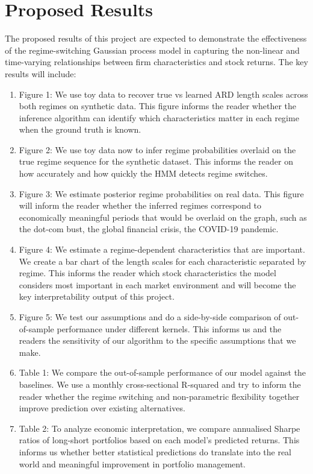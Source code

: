 \documentclass[11pt]{article}
\begin{document}
\section{Proposed Results}
The proposed results of this project are expected to demonstrate the effectiveness of the regime-switching Gaussian process model in capturing the non-linear and time-varying relationships between firm characteristics and stock returns. The key results will include:
\begin{enumerate}
    \item Figure 1: We use toy data to recover true vs learned ARD length scales across both regimes on synthetic data. This figure informs the reader whether the inference algorithm can identify which characteristics matter in each regime when the ground truth is known. 
    \item Figure 2: We use toy data now to infer regime probabilities overlaid on the true regime sequence for the synthetic dataset. This informs the reader on how accurately and how quickly the HMM detects regime switches. 
    \item Figure 3: We estimate posterior regime probabilities on real data. This figure will inform the reader whether the inferred regimes correspond to economically meaningful periods that would be overlaid on the graph, such as the dot-com bust, the global financial crisis, the COVID-19 pandemic. 
    \item Figure 4: We estimate a regime-dependent characteristics that are important. We create a bar chart of the length scales for each characteristic separated by regime. This informs the reader which stock characteristics the model considers most important in each market environment and will become the key interpretability output of this project. 
    \item Figure 5: We test our assumptions and do a side-by-side comparison of out-of-sample performance under different kernels. This informs us and the readers the sensitivity of our algorithm to the specific assumptions that we make. 
    \item Table 1: We compare the out-of-sample performance of our model against the baselines. We use a monthly cross-sectional R-squared and try to inform the reader whether the regime switching and non-parametric flexibility together improve prediction over existing alternatives. 
    \item Table 2: To analyze economic interpretation, we compare annualised Sharpe ratios of long-short portfolios based on each model's predicted returns. This informs us whether better statistical predictions do translate into the real world and meaningful improvement in portfolio management.
\end{enumerate}
\end{document}
